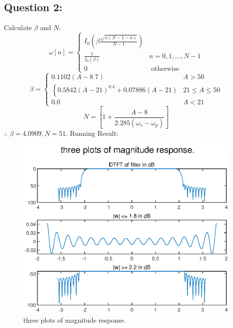 \documentclass[onecolumn,oneside]{SUSTechHomework}
\begin{document}
\subsection*{Question 2:}
Calculate $\beta$ and $N$:
$$
\omega[n]=\left\{\begin{array}{ll}I_{0}\left(\beta \frac{\sqrt{n(N-1-n)}}{N-1}\right) \\\frac{1}{I_{0}(\beta)} & n=0,1, \ldots, N-1 \\0 & \text { otherwise }\end{array}\right.
$$
$$
\beta=\left\{\begin{array}{lr}0.1102(A-8.7) & A>50 \\\left\{0.5842(A-21)^{0.4}+0.07886(A-21)\right. & 21 \leq A \leq 50 \\0.0 & A<21\end{array}\right.
$$
$$
N=\left[1+\frac{A-8}{2.285\left(\omega_{s}-\omega_{p}\right)}\right]
$$
$\therefore$ $\beta=4.0909, N=51$.
Running Result:
\begin{figure}[H]
	\centering
	\includegraphics[width=150mm]{pictures/win2.eps}
	\caption{three plots of magnitude response.}
\end{figure}
\end{document}

